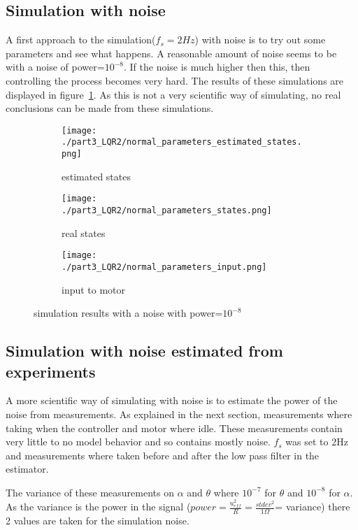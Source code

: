 \subsection{Simulation with noise}
	A first approach to the simulation($f_s=2Hz$) with noise is to try out some parameters and see what happens. A reasonable amount of noise seems to be with a noise of power=$10^{-8}$. If the noise is much higher then this, then controlling the process becomes very hard. The results of these simulations are displayed in figure~\ref{fig:simulation results with a noise with power=$10^{-8}$}. As this is not a very scientific way of simulating, no real conclusions can be made from these simulations.
	\begin{figure}[H]
		\centering
		\begin{subfigure}[b]{0.45\textwidth}
			\texttt{[image: ./part3\_LQR2/normal\_parameters\_estimated\_states.png]}
			\caption{estimated states}
		\end{subfigure}
		\begin{subfigure}[b]{0.45\textwidth}
			\texttt{[image: ./part3\_LQR2/normal\_parameters\_states.png]}
			\caption{real states}
		\end{subfigure}
		\begin{subfigure}[b]{0.45\textwidth}
			\texttt{[image: ./part3\_LQR2/normal\_parameters\_input.png]}
			\caption{input to motor}
		\end{subfigure}
		\caption{simulation results with a noise with power=$10^{-8}$}
		\label{fig:simulation results with a noise with power=$10^{-8}$}
	\end{figure}
\subsection{Simulation with noise estimated from experiments}
	A more scientific way of simulating with noise is to estimate the power of the noise from measurements. As explained in the next section, measurements where taking when the controller and motor where idle. These measurements contain very little to no model behavior and so contains mostly noise. $f_s$ was set to 2Hz and measurements where taken before and after the low pass filter in the estimator. 
	
	The variance of these measurements on $\alpha$ and $\theta$ where $10^{-7}$ for $\theta$ and $10^{-8}$ for $\alpha$. As the variance is the power in the signal ($power = \frac{u_{eff}^2}{R} = \frac{stdev^2}{1 \Omega}$= variance) there 2 values are taken for the simulation noise.
	

